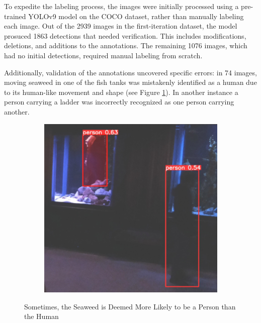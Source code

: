 \newpage
To expedite the labeling process, the images were initially processed using a pre-trained YOLOv9 model on the COCO dataset, rather than manually labeling each image. Out of the 2939 images in the first-iteration dataset, the model prosuced 1863 detections that needed verification. This includes modifications, deletions, and additions to the annotations. The remaining 1076 images, which had no initial detections, required manual labeling from scratch.

Additionally, validation of the annotations uncovered specific errors: in 74 images, moving seaweed in one of the fish tanks was mistakenly identified as a human due to its human-like movement and shape (see Figure \ref{fig:seaweed_man}). In another instance a person carrying a ladder was incorrectly recognized as one person carrying another.

\begin{figure}[H]
    \centering
    \begin{subfigure}{0.60\textwidth}
        \centering
        \includegraphics[width=\textwidth]{Images/Fun/seaweed-man-more-than-I.png}
    \end{subfigure}
    \caption{Sometimes, the Seaweed is Deemed More Likely to be a Person than the Human}
    \label{fig:seaweed_man}
\end{figure}

